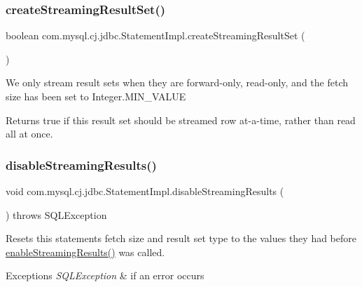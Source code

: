 \subsubsection{\texorpdfstring{create\+Streaming\+Result\+Set()}{createStreamingResultSet()}}
{\footnotesize\ttfamily boolean com.\+mysql.\+cj.\+jdbc.\+Statement\+Impl.\+create\+Streaming\+Result\+Set (\begin{DoxyParamCaption}{ }\end{DoxyParamCaption})\hspace{0.3cm}{\ttfamily [protected]}}

We only stream result sets when they are forward-\/only, read-\/only, and the fetch size has been set to Integer.\+M\+I\+N\+\_\+\+V\+A\+L\+UE

\begin{DoxyReturn}{Returns}
true if this result set should be streamed row at-\/a-\/time, rather than read all at once. 
\end{DoxyReturn}
\mbox{\label{classcom_1_1mysql_1_1cj_1_1jdbc_1_1_statement_impl_a9e5713d601e7e410e0edb1647b6f9160}} 
\subsubsection{\texorpdfstring{disable\+Streaming\+Results()}{disableStreamingResults()}}
{\footnotesize\ttfamily void com.\+mysql.\+cj.\+jdbc.\+Statement\+Impl.\+disable\+Streaming\+Results (\begin{DoxyParamCaption}{ }\end{DoxyParamCaption}) throws S\+Q\+L\+Exception}

Resets this statements fetch size and result set type to the values they had before \mbox{\hyperlink{classcom_1_1mysql_1_1cj_1_1jdbc_1_1_statement_impl_a973ff5045e258a5c3e156887c116c976}{enable\+Streaming\+Results()}} was called.


\begin{DoxyExceptions}{Exceptions}
{\em S\+Q\+L\+Exception} & if an error occurs \\
\hline
\end{DoxyExceptions}


